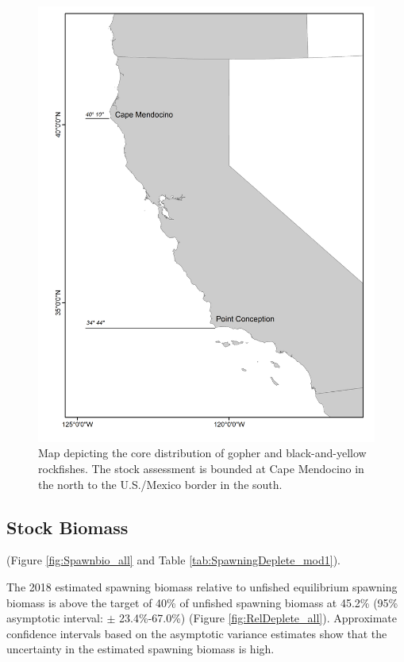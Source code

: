 \documentclass[12pt,]{article}
\begin{document}
\begin{figure}
\centering
\includegraphics{Figures/assess_region_map.png}
\caption{Map depicting the core distribution of gopher and
black-and-yellow rockfishes. The stock assessment is bounded at Cape
Mendocino in the north to the U.S./Mexico border in the south.
\label{fig:assess_region_map}}
\end{figure}

\FloatBarrier

\subsection*{Stock Biomass}\label{stock-biomass}

(Figure \ref{fig:Spawnbio_all} and Table
\ref{tab:SpawningDeplete_mod1}).

The 2018 estimated spawning biomass relative to unfished equilibrium
spawning biomass is above the target of 40\% of unfished spawning
biomass at 45.2\% (95\% asymptotic interval: \(\pm\) 23.4\%-67.0\%)
(Figure \ref{fig:RelDeplete_all}). Approximate confidence intervals
based on the asymptotic variance estimates show that the uncertainty in
the estimated spawning biomass is high.
\end{document}
